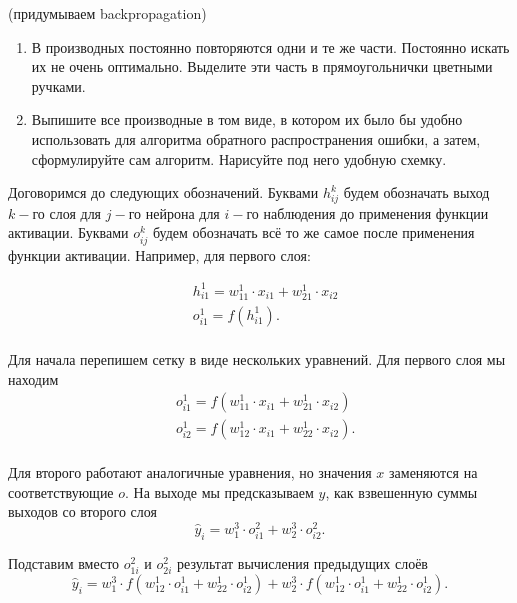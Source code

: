 \begin{problem}{(придумываем backpropagation)}
\begin{enumerate}
    	\item В производных постоянно повторяются одни и те же части. Постоянно искать их не очень оптимально. Выделите эти часть в прямоугольнички цветными ручками. 
    	
    	\item Выпишите все производные в том виде, в котором их было бы удобно использовать для алгоритма обратного распространения ошибки, а затем, сформулируйте сам алгоритм. Нарисуйте под него удобную схемку.
    \end{enumerate}
\end{problem}

\begin{sol} Договоримся до следующих обозначений. Буквами $h^k_{ij}$ будем обозначать выход $k-$го слоя для $j-$го нейрона для $i-$го наблюдения до применения функции активации. Буквами  $o^k_{ij}$ будем обозначать всё то же самое после применения функции активации. Например, для первого слоя:

\begin{equation*}
    \begin{aligned} 
    & h^1_{i1} = w^1_{11} \cdot x_{i1} +  w^1_{21} \cdot x_{i2} \\
    & o^1_{i1} = f(h_{i1}^1). \\
    \end{aligned} 
\end{equation*}

 Для начала перепишем сетку в виде нескольких уравнений. Для первого слоя мы находим
\begin{equation*}
    \begin{aligned} 
    & o^1_{i1} = f( w^1_{11} \cdot x_{i1} +  w^1_{21} \cdot x_{i2}) \\
    & o^1_{i2} = f( w^1_{12} \cdot x_{i1} +  w^1_{22} \cdot x_{i2}). \\
    \end{aligned} 
\end{equation*}

Для второго работают аналогичные уравнения, но значения $x$ заменяются на соответствующие $o$. На выходе мы предсказываем $y$, как взвешенную суммы выходов со второго слоя
\[
\hat{y}_i = w_1^3 \cdot o^2_{i1} + w_2^3 \cdot o^2_{i2}.
\]

Подставим вместо $o^2_{1i}$ и $o^2_{2i}$ результат вычисления предыдущих слоёв
\[
\hat{y}_i = w_1^3 \cdot f( w^1_{12} \cdot o^1_{i1} +  w^1_{22} \cdot o^1_{i2}) + w_2^3 \cdot f( w^1_{12} \cdot o^1_{i1} +  w^1_{22} \cdot o^1_{i2}).
\]


\end{sol}
